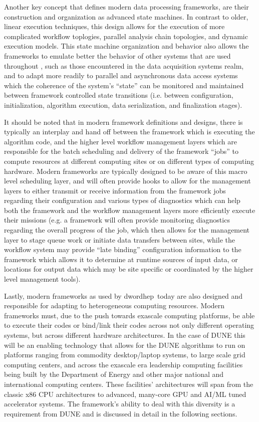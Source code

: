 \documentclass[../main-v1.tex]{subfiles}
\begin{document}
Another key concept that defines modern data processing frameworks, are their construction and organization as advanced state machines.  In contrast to older, linear execution techniques, this design allows for the execution of more complicated workflow toplogies, parallel analysis chain topologies, and dynamic execution models.  This state machine organization and behavior also allows the frameworks to emulate better the behavior of other systems that are used throughout  , such as those encountered in the data acquisition systems realm, and to adapt more readily to parallel and asynchronous data access systems which the coherence of the system's ``state'' can be monitored and maintained between framework controlled state transitions (i.e. between configuration, initialization, algorithm execution, data serialization, and finalization stages).  

It should be noted that in modern framework definitions and designs, there is typically an interplay and hand off between the framework which is executing the algorithm code, and the higher level workflow management layers which are responsible for the batch scheduling and delivery of the framework ``jobs'' to compute resources at different computing sites or on different types of computing hardware.  Modern frameworks are typically designed to be aware of this macro level scheduling layer, and will often provide hooks to allow for the management layers to either transmit or receive information from the framework jobs regarding their configuration and various types of diagnostics which can help both the framework and the workflow management layers more efficiently execute their missions (e.g. a framework will often provide monitoring diagnostics regarding the overall progress of the job, which then allows for the management layer to stage queue work or initiate data transfers between sites,  while the workflow system may provide ``late binding'' configuration information to the framework which allows it to determine at runtime sources of input data, or locations for output data which may be site specific or coordinated by the higher level management tools).

Lastly, modern frameworks as used by dword{hep}\ today are also designed and responsible for adapting to  heterogeneous computing resources.  Modern frameworks must, due to the push towards exascale computing platforms, be able to execute their codes or bind/link their codes across not only different operating systems, but across different hardware architectures.   In the case of DUNE this will be an enabling technology that allows for the DUNE algorithms to run on platforms ranging from commodity desktop/laptop systems, to large scale grid computing centers, and across the exascale era leadership computing facilities being built by the Department of Energy and other major national and international computing centers. These facilities' architectures will span from the classic x86 CPU architectures to advanced, many-core GPU and AI/ML tuned accelerator systems.  The framework's ability to deal with this diversity is a requirement from DUNE and is discussed in detail in the following sections.
\end{document}
